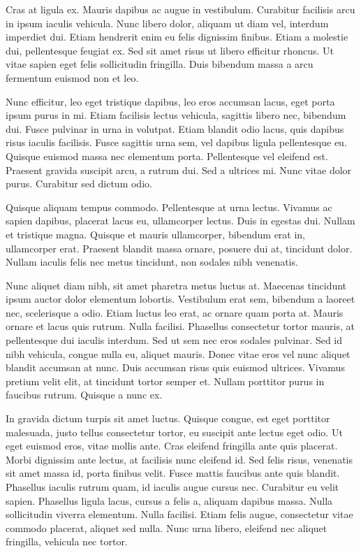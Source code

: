 \documentclass{article}
\begin{document}
Cras at ligula ex. Mauris dapibus ac augue in vestibulum. Curabitur facilisis arcu in ipsum iaculis vehicula. Nunc libero dolor, aliquam ut diam vel, interdum imperdiet dui. Etiam hendrerit enim eu felis dignissim finibus. Etiam a molestie dui, pellentesque feugiat ex. Sed sit amet risus ut libero efficitur rhoncus. Ut vitae sapien eget felis sollicitudin fringilla. Duis bibendum massa a arcu fermentum euismod non et leo.

Nunc efficitur, leo eget tristique dapibus, leo eros accumsan lacus, eget porta ipsum purus in mi. Etiam facilisis lectus vehicula, sagittis libero nec, bibendum dui. Fusce pulvinar in urna in volutpat. Etiam blandit odio lacus, quis dapibus risus iaculis facilisis. Fusce sagittis urna sem, vel dapibus ligula pellentesque eu. Quisque euismod massa nec elementum porta. Pellentesque vel eleifend est. Praesent gravida suscipit arcu, a rutrum dui. Sed a ultrices mi. Nunc vitae dolor purus. Curabitur sed dictum odio.

Quisque aliquam tempus commodo. Pellentesque at urna lectus. Vivamus ac sapien dapibus, placerat lacus eu, ullamcorper lectus. Duis in egestas dui. Nullam et tristique magna. Quisque et mauris ullamcorper, bibendum erat in, ullamcorper erat. Praesent blandit massa ornare, posuere dui at, tincidunt dolor. Nullam iaculis felis nec metus tincidunt, non sodales nibh venenatis.

Nunc aliquet diam nibh, sit amet pharetra metus luctus at. Maecenas tincidunt ipsum auctor dolor elementum lobortis. Vestibulum erat sem, bibendum a laoreet nec, scelerisque a odio. Etiam luctus leo erat, ac ornare quam porta at. Mauris ornare et lacus quis rutrum. Nulla facilisi. Phasellus consectetur tortor mauris, at pellentesque dui iaculis interdum. Sed ut sem nec eros sodales pulvinar. Sed id nibh vehicula, congue nulla eu, aliquet mauris. Donec vitae eros vel nunc aliquet blandit accumsan at nunc. Duis accumsan risus quis euismod ultrices. Vivamus pretium velit elit, at tincidunt tortor semper et. Nullam porttitor purus in faucibus rutrum. Quisque a nunc ex.

In gravida dictum turpis sit amet luctus. Quisque congue, est eget porttitor malesuada, justo tellus consectetur tortor, eu suscipit ante lectus eget odio. Ut eget euismod eros, vitae mollis ante. Cras eleifend fringilla ante quis placerat. Morbi dignissim ante lectus, at facilisis nunc eleifend id. Sed felis risus, venenatis sit amet massa id, porta finibus velit. Fusce mattis faucibus ante quis blandit. Phasellus iaculis rutrum quam, id iaculis augue cursus nec. Curabitur eu velit sapien. Phasellus ligula lacus, cursus a felis a, aliquam dapibus massa. Nulla sollicitudin viverra elementum. Nulla facilisi. Etiam felis augue, consectetur vitae commodo placerat, aliquet sed nulla. Nunc urna libero, eleifend nec aliquet fringilla, vehicula nec tortor.
\end{document}
